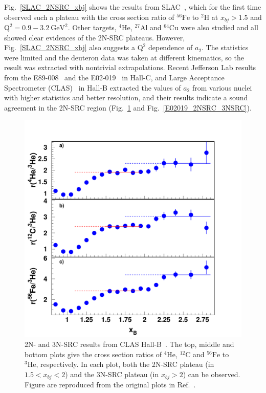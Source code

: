 Fig.~\ref{SLAC_2NSRC_xbj} shows the results from SLAC~\cite{SLAC_Measurement_PRC.48.2451}, which for the first time observed such a plateau with the cross section ratio of $\mathrm{^{56}Fe}$ to $\mathrm{^{2}H}$ at $x_{bj}>1.5$ and $\mathrm{Q^{2}=0.9-3.2~GeV^{2}}$. Other targets, $\mathrm{^{4}He}$, $\mathrm{^{27}Al}$ and $\mathrm{^{64}Cu}$ were also studied and all showed clear evidences of the 2N-SRC plateaus. However, Fig.~\ref{SLAC_2NSRC_xbj} also suggests a $\mathrm{Q^{2}}$ dependence of $a_{2}$. The statistics were limited and the deuteron data was taken at different kinematics, so the result was extracted with nontrivial extrapolations. Recent Jefferson Lab results from the E89-008~\cite{Arrington:2003tw, Arrington:2006pn} and the E02-019~\cite{PhysRevLett.108.092502} in Hall-C, and Large Acceptance Spectrometer (CLAS)~\cite{PhysRevLett.96.082501} in Hall-B extracted the values of $a_{2}$ from various nuclei with higher statistics and better resolution, and their results indicate a sound agreement in the 2N-SRC region (Fig.~\ref{CLAS_2NSRC_3NSRC} and Fig.~\ref{E02019_2NSRC_3NSRC}). 
\begin{figure}[!ht]
  \begin{center}
    \includegraphics[type=pdf,ext=.pdf,read=.pdf,width=0.70\linewidth]{./figures/physics/CLAS_2NSRC_3NSRC}
    \caption[2N- and 3N-SRC results from CLAS in Hall-B]{\footnotesize{2N- and 3N-SRC results from CLAS Hall-B~\cite{PhysRevLett.96.082501}. The top, middle and bottom plots give the cross section ratios of $\mathrm{^{4}He}$, $\mathrm{^{12}C}$ and $\mathrm{^{56}Fe}$ to $\mathrm{^{3}He}$, respectively. In each plot, both the 2N-SRC plateau (in $1.5<x_{bj}<2$) and the 3N-SRC plateau (in $x_{bj}>2$) can be observed. Figure are reproduced from the original plots in Ref.~\cite{PhysRevLett.96.082501}.}}
    \label{CLAS_2NSRC_3NSRC}
  \end{center}
\end{figure} 

